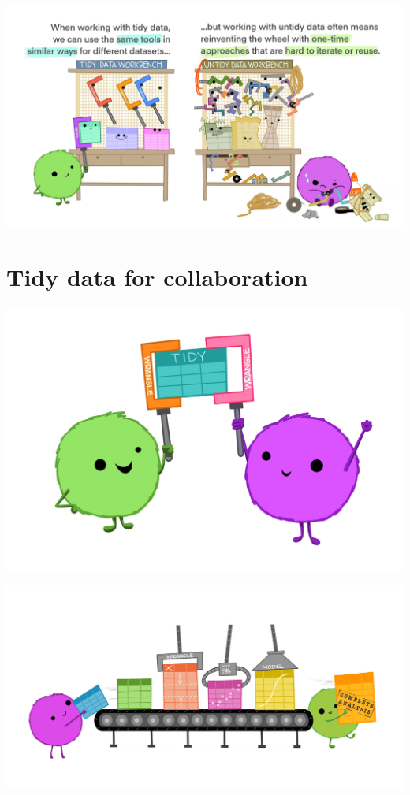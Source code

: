 \documentclass[
]{book}
\begin{document}
\includegraphics{images/tidydata_3.jpg}

\hypertarget{tidy-data-for-collaboration}{%
\section{Tidy data for collaboration}\label{tidy-data-for-collaboration}}

\includegraphics[width=5.22917in,height=\textheight]{images/tidydata_4.jpg}

\includegraphics{images/tidydata_5.jpg}
\end{document}
